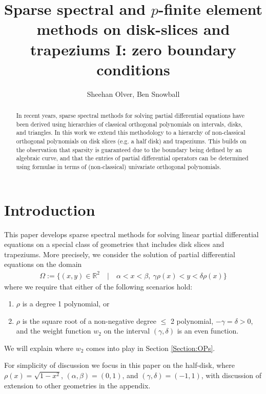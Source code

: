 \documentclass[11pt, oneside]{article}   	%
\title{Sparse spectral and $p$-finite element methods on disk-slices and trapeziums I: zero boundary conditions}
\author{Sheehan Olver, Ben Snowball}
\newcommand{\R}{\mathbb{R}}
\begin{document}
\maketitle

\begin{abstract}
In recent years, sparse spectral methods for solving partial differential equations have been derived using hierarchies of classical orthogonal polynomials on intervals, disks, and triangles. In this work we extend this methodology to a hierarchy of non-classical orthogonal polynomials on disk slices (e.g. a half disk) and trapeziums. This builds on the observation that sparsity is guaranteed due to the boundary being defined by an algebraic curve, and that the entries of partial differential operators can be determined using formulae in terms of (non-classical) univariate orthogonal polynomials. 
\end{abstract}


%
\section{Introduction}

This paper develops sparse spectral methods for solving linear partial differential equations on a special class of geometries that includes disk slices and trapeziums.  
More precisely, we consider the solution of partial differential equations on the domain
\begin{align}
	\Omega := \{(x,y) \in \R^2 \quad | \quad \alpha < x < \beta, \: \gamma \rho(x) < y < \delta \rho(x)\}
\end{align}
where we require that either of the following scenarios hold:
\begin{enumerate}
\item  \(\rho\) is a degree 1 polynomial, or 
\item \(\rho\) is the square root of a non-negative degree \(\le\) 2 polynomial, \(-\gamma = \delta > 0\), and the weight function \(w_2\) on the interval $(\gamma, \delta)$ is an even function.
\end{enumerate}
We will explain where $w_2$ comes into play in Section \ref{Section:OPs}.

For simplicity of discussion we focus in this paper on the half-disk, where $\rho(x) = \sqrt{1-x^2}$,  $(\alpha,\beta) = (0, 1)$, and  $(\gamma, \delta)  = (-1,1)$, with discussion of extension to other geometries in the appendix. 
\end{document}
